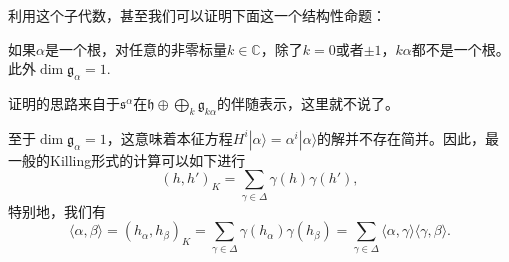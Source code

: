 \documentclass[9pt]{extarticle}
\newcommand{\cc}{\mathbb{C}}
\newcommand{\lag}{{\mathfrak{g}}}
\DeclareMathOperator{\ad}{ad}
\begin{document}
利用这个子代数，甚至我们可以证明下面这一个结构性命题：

\pro 如果$\alpha$是一个根，对任意的非零标量$k\in \cc$，除了$k=0$或者$\pm 1$，$k\alpha$都不是一个根。此外$\dim \lag_{\alpha}=1$. 

证明的思路来自于$\mathfrak{s}^\alpha$在$\mathfrak{h} \oplus \bigoplus_k \lag_{k\alpha}$的伴随表示，这里就不说了。

至于$\dim \lag_{\alpha}=1$，这意味着本征方程$H^i|\alpha\rangle = \alpha^i|\alpha\rangle$的解并不存在简并。因此，最一般的Killing形式的计算可以如下进行
\[
	(h,h')_K=\sum_{\gamma \in \Delta}\gamma(h)\gamma(h'),
\]
特别地，我们有
\[
	\langle \alpha,\beta \rangle=(h_\alpha,h_\beta)_K=\sum_{\gamma \in \Delta}\gamma(h_\alpha)\gamma(h_\beta)=\sum_{\gamma \in \Delta}\langle \alpha,\gamma\rangle\langle \gamma,\beta\rangle.
\]






\end{document}
